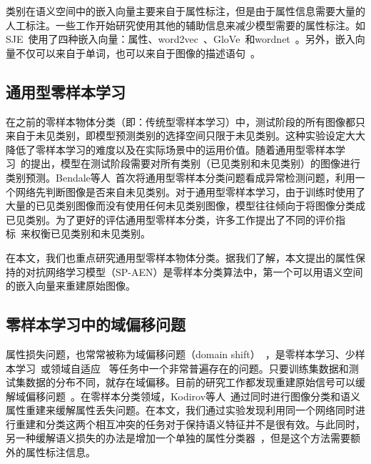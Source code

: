 类别在语义空间中的嵌入向量主要来自于属性标注，但是由于属性信息需要大量的人工标注。一些工作开始研究使用其他的辅助信息来减少模型需要的属性标注。如SJE~\cite{akata2015evaluation}使用了四种嵌入向量：属性、word2vec~\cite{mikolov2013distributed}、GloVe~\cite{pennington2014glove}和wordnet~\cite{miller1995wordnet}。另外，嵌入向量不仅可以来自于单词，也可以来自于图像的描述语句~\cite{reed2016learning,lei2015predicting,elhoseiny2013write}。


\subsection{通用型零样本学习}
在之前的零样本物体分类（即：传统型零样本学习）中，测试阶段的所有图像都只来自于未见类别，即模型预测类别的选择空间只限于未见类别。这种实验设定大大降低了零样本学习的难度以及在实际场景中的运用价值。随着通用型零样本学习~\cite{scheirer2012toward}的提出，模型在测试阶段需要对所有类别（已见类别和未见类别）的图像进行类别预测。Bendale等人~\cite{bendale2016towards}首次将通用型零样本分类问题看成异常检测问题，利用一个网络先判断图像是否来自未见类别。对于通用型零样本学习，由于训练时使用了大量的已见类别图像而没有使用任何未见类别图像，模型往往倾向于将图像分类成已见类别。为了更好的评估通用型零样本分类，许多工作提出了不同的评价指标~\cite{chao2016empirical,xian2018zero}来权衡已见类别和未见类别。

在本文，我们也重点研究通用型零样本物体分类。据我们了解，本文提出的属性保持的对抗网络学习模型（SP-AEN）是零样本分类算法中，第一个可以用语义空间的嵌入向量来重建原始图像。

\subsection{零样本学习中的域偏移问题}
属性损失问题，也常常被称为域偏移问题（domain shift）~\cite{fu2015transductive,saenko2010adapting}，是零样本学习、少样本学习~\cite{hariharan2017low}或领域自适应~\cite{motiian2017unified,panareda2017open}
等任务中一个非常普遍存在的问题。只要训练集数据和测试集数据的分布不同，就存在域偏移。目前的研究工作都发现重建原始信号可以缓解域偏移问题~\cite{kim2017learning}。在零样本分类领域，Kodirov等人~\cite{kodirov2017semantic}通过同时进行图像分类和语义属性重建来缓解属性丢失问题。在本文，我们通过实验发现利用同一个网络同时进行重建和分类这两个相互冲突的任务对于保持语义特征并不是很有效。与此同时，另一种缓解语义损失的办法是增加一个单独的属性分类器~\cite{morgado2017semantically}，但是这个方法需要额外的属性标注信息。

